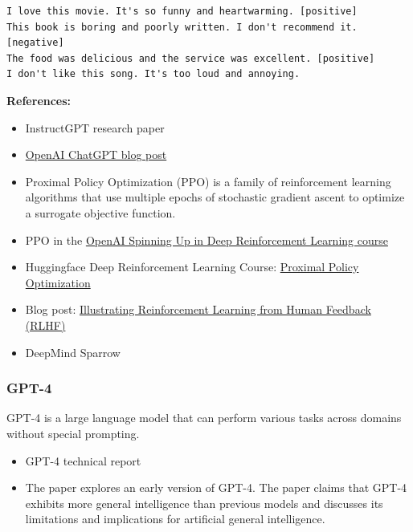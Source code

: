 \documentclass[11pt, a4paper]{amsart}
\begin{document}
\begin{lstlisting}
I love this movie. It's so funny and heartwarming. [positive]
This book is boring and poorly written. I don't recommend it. [negative]
The food was delicious and the service was excellent. [positive]
I don't like this song. It's too loud and annoying.
\end{lstlisting}

\noindent \textbf{References:}
\begin{itemize}
	\item InstructGPT research paper \cite{ouyang2022training}
	\item \href{https://openai.com/blog/chatgpt}{OpenAI ChatGPT blog post}
	\item Proximal Policy Optimization (PPO) \cite{schulman2017proximal} is a family of reinforcement learning algorithms that use multiple epochs of stochastic gradient ascent to optimize a surrogate objective function.
	\item PPO in the \href{https://spinningup.openai.com/en/latest/algorithms/ppo.html}{OpenAI Spinning Up in Deep Reinforcement Learning course}
	\item Huggingface Deep Reinforcement Learning Course: \href{https://huggingface.co/deep-rl-course/unit8/introduction?fw=pt}{Proximal Policy Optimization}
	\item Blog post: \href{https://huggingface.co/blog/rlhf}{Illustrating Reinforcement Learning from Human Feedback (RLHF)}
	\item DeepMind Sparrow \cite{glaese2022improving}
\end{itemize}

\subsubsection{GPT-4}

GPT-4 is a large language model that can perform various tasks across domains without special prompting.

\begin{itemize}
	\item GPT-4 technical report \cite{openai2023gpt4}
	\item The paper \cite{bubeck2023sparks} explores an early version of GPT-4.
	The paper claims that GPT-4 exhibits more general intelligence than previous models and discusses its limitations and implications for artificial general intelligence.
\end{itemize}
\end{document}
